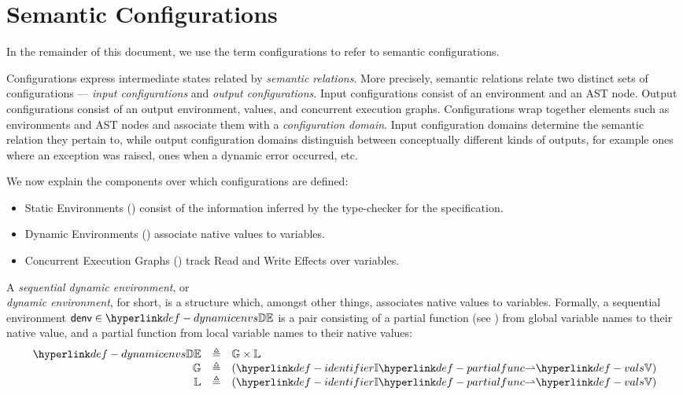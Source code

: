 \documentclass{book}
\begin{document}
\section{Semantic Configurations \label{sec:configurations}}

In the remainder of this document, we use the term configurations to refer to semantic configurations.

Configurations express intermediate states related by \emph{semantic relations}.
%
More precisely, semantic relations relate two distinct sets of configurations ---
\emph{input configurations} and \emph{output configurations}.
Input configurations consist of an environment and an AST node.
Output configurations consist of an output environment, values,
and concurrent execution graphs.
%
Configurations wrap together elements such as environments and AST nodes
and associate them with a \emph{configuration domain}. Input configuration domains
determine the semantic relation they pertain to, while output configuration
domains distinguish between conceptually different kinds of outputs, for example
ones where an exception was raised, ones when a dynamic error occurred, etc.

We now explain the components over which configurations are defined:
\begin{itemize}
  \item Static Environments () consist of the information inferred
  by the type-checker for the specification.
  \item Dynamic Environments () associate native values to variables.
  \item Concurrent Execution Graphs () track Read and Write Effects over variables.
\end{itemize}

\hypertarget{def-dynamicenvs}{}
\begin{definition}
A \emph{sequential dynamic environment}, or \\ \emph{dynamic environment}, for short, is a structure which,
amongst other things, associates native values to variables.
Formally, a sequential environment $\denv \in \dynamicenvs$ is a pair consisting of a partial function
(see ) from global
variable names to their native value, and a partial function from local variable names to their
native values:
\[
\begin{array}{rcl}
  \dynamicenvs          &\triangleq&  \mathbb{G} \times \mathbb{L} \\
  \mathbb{G}            &\triangleq&  (\Identifiers \partialto \vals) \\
  \mathbb{L}            &\triangleq&  (\Identifiers \partialto \vals) \\
\end{array}
\]
\end{definition}
\end{document}
